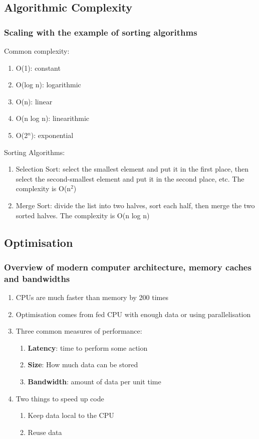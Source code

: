 \documentclass[12pt,a4paper]{article}
\begin{document}
\subsection{Algorithmic Complexity}
    \subsubsection{Scaling with the example of sorting algorithms}
    Common complexity:
    \begin{enumerate}
        \item O(1): constant
        \item O(log n): logarithmic
        \item O(n): linear
        \item O(n log n): linearithmic
        \item O(2$^n$): exponential
    \end{enumerate}
    Sorting Algorithms:
    \begin{enumerate}
        \item Selection Sort: select the smallest element and put it in the first place, then select the second-smallest element and put it in the second place, etc. The complexity is O(n$^2$)
        \item Merge Sort: divide the list into two halves, sort each half, then merge the two sorted halves. The complexity is O(n log n)
    \end{enumerate}

\subsection{Optimisation}
\subsubsection{Overview of modern computer architecture, memory caches and bandwidths}
\begin{enumerate}
    \item CPUs are much faster than memory by 200 times
    \item Optimisation comes from fed CPU with enough data or using parallelisation 
    \item Three common measures of performance:
    \begin{enumerate}
        \item \textbf{Latency}: time to perform some action
        \item \textbf{Size}: How much data can be stored
        \item \textbf{Bandwidth}: amount of data per unit time
    \end{enumerate}
    \item Two things to speed up code
    \begin{enumerate}
        \item Keep data local to the CPU
        \item Reuse data
    \end{enumerate}
\end{enumerate}
\end{document}
